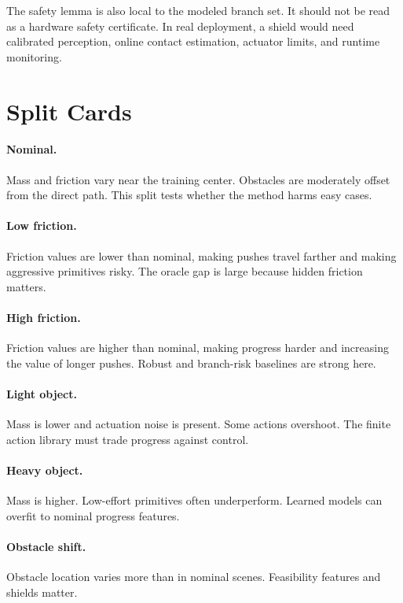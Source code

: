 \documentclass{article}
\begin{document}
The safety lemma is also local to the modeled branch set.  It should not be read as a hardware safety certificate.  In real deployment, a shield would need calibrated perception, online contact estimation, actuator limits, and runtime monitoring.

\section{Split Cards}

\paragraph{Nominal.}
Mass and friction vary near the training center.  Obstacles are moderately offset from the direct path.  This split tests whether the method harms easy cases.

\paragraph{Low friction.}
Friction values are lower than nominal, making pushes travel farther and making aggressive primitives risky.  The oracle gap is large because hidden friction matters.

\paragraph{High friction.}
Friction values are higher than nominal, making progress harder and increasing the value of longer pushes.  Robust and branch-risk baselines are strong here.

\paragraph{Light object.}
Mass is lower and actuation noise is present.  Some actions overshoot.  The finite action library must trade progress against control.

\paragraph{Heavy object.}
Mass is higher.  Low-effort primitives often underperform.  Learned models can overfit to nominal progress features.

\paragraph{Obstacle shift.}
Obstacle location varies more than in nominal scenes.  Feasibility features and shields matter.
\end{document}
